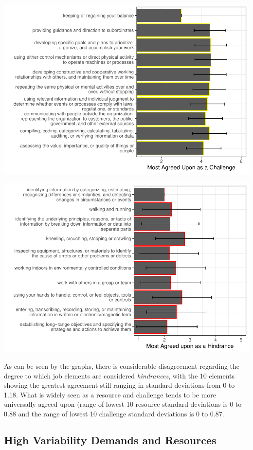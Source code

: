 \documentclass[
  english,
  man]{apa6}
\begin{document}
\includegraphics{Submission_files/figure-latex/challengesagree-1.pdf}

\includegraphics{Submission_files/figure-latex/hindrancesagree-1.pdf}

As can be seen by the graphs, there is considerable disagreement regarding the degree to which job elements are considered \emph{hindrances}, with the 10 elements showing the greatest agreement still ranging in standard deviations from 0 to 1.18. What is widely seen as a resource and challenge tends to be more universally agreed upon (range of lowest 10 resource standard deviations is 0 to 0.88 and the range of lowest 10 challenge standard deviations is 0 to 0.87.

\hypertarget{high-variability-demands-and-resources}{%
\subsection{High Variability Demands and Resources}\label{high-variability-demands-and-resources}}
\end{document}

